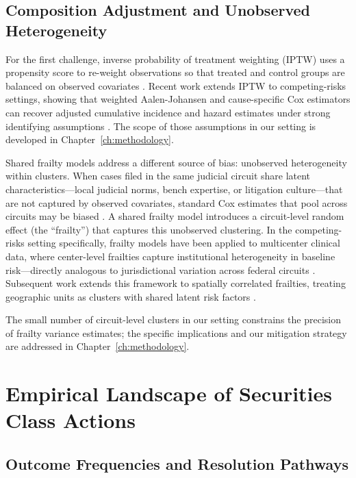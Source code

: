 \subsection{Composition Adjustment and Unobserved Heterogeneity}

For the first challenge, inverse probability of treatment
weighting (IPTW) uses a propensity
score to re-weight observations so that treated and control
groups are balanced on observed covariates
\citep{xieliu2005}. Recent work extends IPTW to
competing-risks settings, showing that weighted Aalen-Johansen
and cause-specific Cox estimators can recover adjusted
cumulative incidence and hazard estimates under strong
identifying assumptions \citep{austinfine2025}. The scope
of those assumptions in our setting is developed in
Chapter~\ref{ch:methodology}.

Shared frailty models address a different source of bias:
unobserved heterogeneity within clusters. When cases filed
in the same judicial circuit share latent characteristics---local
judicial norms, bench expertise, or litigation culture---that
are not captured by observed covariates, standard Cox
estimates that pool across circuits may be biased
\citep{ruetenbudde2019}. A shared frailty model introduces
a circuit-level random effect (the ``frailty'') that captures
this unobserved clustering. In the competing-risks setting
specifically, frailty models have been applied to multicenter
clinical data, where center-level frailties capture
institutional heterogeneity in baseline risk---directly
analogous to jurisdictional variation across federal circuits
\citep{ruetenbudde2019}. Subsequent work extends this
framework to spatially correlated frailties, treating
geographic units as clusters with shared latent risk factors
\citep{frevent2024}.

The small number of circuit-level clusters in our setting
constrains the precision of frailty variance estimates; the
specific implications and our mitigation strategy are
addressed in Chapter~\ref{ch:methodology}.

\section{Empirical Landscape of Securities Class Actions}

\subsection{Outcome Frequencies and Resolution Pathways}

